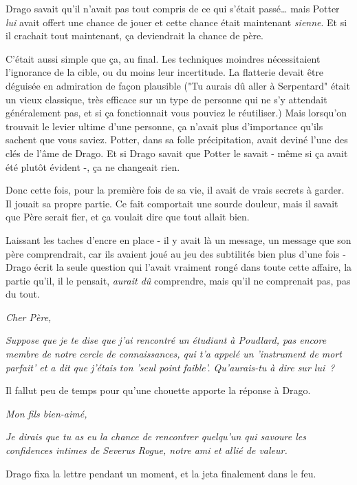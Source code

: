 Drago savait qu'il n'avait pas tout compris de ce qui s'était passé… mais Potter \emph{lui} avait offert une chance de jouer et cette chance était maintenant \emph{sienne}. Et si il crachait tout maintenant, ça deviendrait la chance de père.

C'était aussi simple que ça, au final. Les techniques moindres nécessitaient l'ignorance de la cible, ou du moins leur incertitude. La flatterie devait être déguisée en admiration de façon plausible ("Tu aurais dû aller à Serpentard" était un vieux classique, très efficace sur un type de personne qui ne s'y attendait généralement pas, et si ça fonctionnait vous pouviez le réutiliser.) Mais lorsqu'on trouvait le levier ultime d'une personne, ça n'avait plus d'importance qu'ils sachent que vous saviez. Potter, dans sa folle précipitation, avait deviné l'une des clés de l'âme de Drago. Et si Drago savait que Potter le savait - même si ça avait été plutôt évident -, ça ne changeait rien.

Donc cette fois, pour la première fois de sa vie, il avait de vrais secrets à garder. Il jouait sa propre partie. Ce fait comportait une sourde douleur, mais il savait que Père serait fier, et ça voulait dire que tout allait bien.

Laissant les taches d'encre en place - il y avait là un message, un message que son père comprendrait, car ils avaient joué au jeu des subtilités bien plus d'une fois - Drago écrit la seule question qui l'avait vraiment rongé dans toute cette affaire, la partie qu'il, il le pensait, \emph{aurait dû} comprendre, mais qu'il ne comprenait pas, pas du tout.

\emph{Cher Père,}

\emph{Suppose que je te dise que j'ai rencontré un étudiant à Poudlard, pas encore membre de notre cercle de connaissances, qui t'a appelé un 'instrument de mort parfait' et a dit que j'étais ton 'seul point faible'. Qu'aurais-tu à dire sur lui~?}

Il fallut peu de temps pour qu'une chouette apporte la réponse à Drago.

\emph{Mon fils bien-aimé,}

\emph{Je dirais que tu as eu la chance de rencontrer quelqu'un qui savoure les confidences intimes de Severus Rogue, notre ami et allié de valeur.}

Drago fixa la lettre pendant un moment, et la jeta finalement dans le feu.

